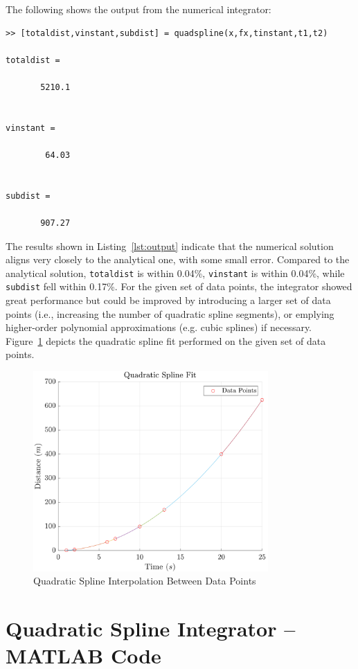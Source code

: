 \documentclass{article}
\newcommand{\mat}[1]{\lstinline[style=matlabstyle]|#1|}
\begin{document}
The following shows the output from the numerical integrator:
\begin{lstlisting}[style=matlabstyle, caption = {Integrator Output},numbers=none, label={lst:output}]
>> [totaldist,vinstant,subdist] = quadspline(x,fx,tinstant,t1,t2)

totaldist =

       5210.1


vinstant =

        64.03


subdist =

       907.27
\end{lstlisting}

The results shown in Listing~\ref{lst:output} indicate that the numerical solution aligns very closely to the analytical one, with some small error. Compared to the analytical solution, \mat{totaldist} is within 0.04\%, \mat{vinstant} is within 0.04\%, while \mat{subdist} fell within 0.17\%. For the given set of data points, the integrator showed great performance but could be improved by introducing a larger set of data points (i.e., increasing the number of quadratic spline segments), or emplying higher-order polynomial approximations (e.g. cubic splines) if necessary.\\

Figure~\ref{fig:fig1} depicts the quadratic spline fit performed on the given set of data points.

\pagebreak

\begin{figure}[h]
    \centering
    \includegraphics[width=0.8\textwidth]{fig/quadSplineFit.png}
    \caption{Quadratic Spline Interpolation Between Data Points}
    \label{fig:fig1}
\end{figure}

\pagebreak

\section{Quadratic Spline Integrator -- MATLAB Code}


\end{document}
